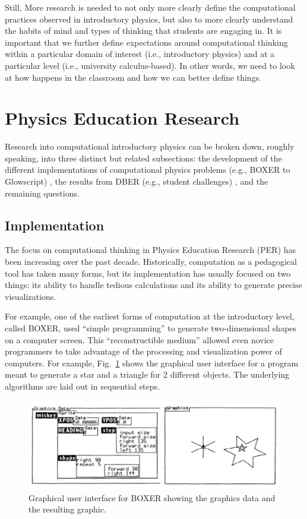 \documentclass{msuphddissertation}
\begin{document}
\begin{doublespace}
Still, More research is needed to not only more clearly define the computational practices observed in introductory physics, but also to more clearly understand the habits of mind and types of thinking that students are engaging in.  It is important that we further define expectations around computational thinking within a particular domain of interest (i.e., introductory physics) and at a particular level (i.e., university calculus-based).  In other words, we need to look at how happens in the classroom and how we can better define things.

\section{Physics Education Research}

Research into computational introductory physics can be broken down, roughly speaking, into three distinct but related subsections: the development of the different implementations of computational physics problems (e.g., BOXER to Glowscript) \cite{DiSessa1986,Redish1992,Chonacky2008,McIntyre2008}, the results from DBER (e.g., student challenges) \cite{Chabay2008,Buffler2008,Belloni2008,Hoover2008,Cook2008,Weiman2008}, and the remaining questions.

\subsection{Implementation}

The focus on computational thinking in Physics Education Research (PER) has been increasing over the past decade.  Historically, computation as a pedagogical tool has taken many forms, but its implementation has usually focused on two things: its ability to handle tedious calculations and its ability to generate precise visualizations.

For example, one of the earliest forms of computation at the introductory level, called BOXER, used ``simple programming'' to generate two-dimensional shapes on a computer screen.  This ``reconstructible medium'' allowed even novice programmers to take advantage of the processing and visualization power of computers.  For example, Fig.~\ref{CH2:BOXER} shows the graphical user interface for a program meant to generate a star and a triangle for 2 different objects.  The underlying algorithms are laid out in sequential steps.

\begin{figure}\center
\includegraphics[scale=0.75]{images/CH2BOXER.pdf}
\caption{Graphical user interface for BOXER showing the graphics data and the resulting graphic.}\label{CH2:BOXER}
\end{figure}


\end{doublespace}
\end{document}
